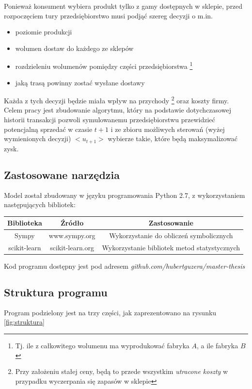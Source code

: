 \documentclass{article}
\begin{document}
Ponieważ konsument wybiera produkt tylko z gamy dostępnych w sklepie, przed rozpoczęciem tury przedsiębiorstwo musi podjąć szereg decyzji o m.in.
	\begin{itemize}
		\item poziomie produkcji
		\item wolumen dostaw do każdego ze sklepów
		\item rozdzieleniu wolumenów pomiędzy części przedsiębiorstwa  \footnote{Tj. ile z całkowitego wolumenu ma wyprodukować fabryka $A$, a ile fabryka $B$}
	 	\item jaką trasą powinny zostać wysłane dostawy
	\end{itemize}

Każda z tych decyzji będzie miała wpływ na przychody \footnote{Przy założeniu stałej ceny, będą to przede wszystkim \textit{utracone koszty} w przypadku wyczerpania się zapasów w sklepie} oraz koszty firmy. Celem pracy jest zbudowanie algorytmu, który na podstawie dotychczasowej historii transakcji pozwoli symulowanemu przedsiębiorstwu przewidzieć potencjalną sprzedać w czasie $ t +1 $ i ze zbioru możliwych sterowań (wyżej wymienionych decyzji) $<u_{t+1}>$ wybierze takie, które będą maksymalizować zysk. 

\subsection{Zastosowane narzędzia}

Model został zbudowany w języku programowania Python 2.7, z wykorzystaniem następujących bibliotek: 

\begin{center}
\begin{tabular}{ c c c }
 Biblioteka & Źródło & Zastosowanie \\ 
\hline
 Sympy & www.sympy.org & Wykorzystanie do obliczeń symbolicznych \\  
 scikit-learn & scikit-learn.org & Wykorzystanie bibliotek metod statystycznych
\end{tabular}
\end{center}

Kod programu dostępny jest pod adresem  \textit{github.com/hubertguzera/master-thesis}

\subsection{Struktura programu}

Program podzielony jest na trzy części, jak zaprezentowano na rysunku \ref{fig:struktura}
\end{document}
